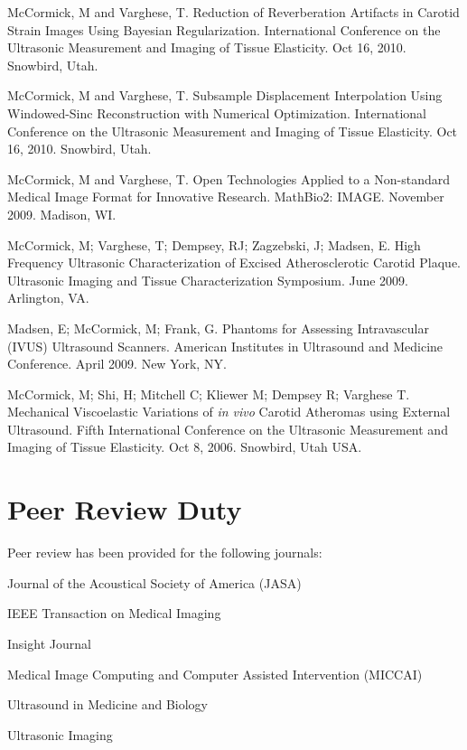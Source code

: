 \documentclass[margin,line]{res}
\newenvironment{list1}{
  \begin{list}{\ding{113}}{%
      \setlength{\itemsep}{0in}
      \setlength{\parsep}{0in} \setlength{\parskip}{0in}
      \setlength{\topsep}{0in} \setlength{\partopsep}{0in} 
      \setlength{\leftmargin}{0.17in}}}{\end{list}}
\begin{document}
\begin{resume}
McCormick, M and Varghese, T.  Reduction of Reverberation Artifacts in Carotid
Strain Images Using Bayesian Regularization.  International Conference on the
Ultrasonic Measurement and Imaging of Tissue Elasticity.  Oct 16, 2010.
Snowbird, Utah.

McCormick, M and Varghese, T.  Subsample Displacement Interpolation Using
Windowed-Sinc Reconstruction with Numerical Optimization.  International
Conference on the Ultrasonic Measurement and Imaging of Tissue Elasticity.  Oct
16, 2010.  Snowbird, Utah.

McCormick, M and Varghese, T.  Open Technologies Applied to a Non-standard Medical
Image Format for Innovative Research.  MathBio2: IMAGE.  November 2009.  Madison, WI.

McCormick, M; Varghese, T; Dempsey, RJ; Zagzebski, J; Madsen, E.  High Frequency Ultrasonic Characterization of Excised Atherosclerotic
Carotid Plaque.  Ultrasonic Imaging and Tissue Characterization
Symposium.  June 2009.  Arlington, VA.

Madsen, E;  McCormick, M;  Frank, G.  Phantoms for Assessing
Intravascular (IVUS) Ultrasound Scanners.  American Institutes in
Ultrasound and Medicine Conference.  April 2009.  New York, NY.

McCormick, M; Shi, H; Mitchell C; Kliewer M; Dempsey R; Varghese T.   Mechanical
Viscoelastic Variations of \textit{in vivo} Carotid Atheromas using External
Ultrasound.  Fifth International Conference on the Ultrasonic Measurement and
Imaging of Tissue Elasticity.  Oct 8, 2006.  Snowbird, Utah USA.


\section{\sc Peer Review Duty}

Peer review has been provided for the following journals:

\begin{list1}
\item[] Journal of the Acoustical Society of America (JASA)
\item[] IEEE Transaction on Medical Imaging
\item[] Insight Journal
\item[] Medical Image Computing and Computer Assisted Intervention (MICCAI)
\item[] Ultrasound in Medicine and Biology
\item[] Ultrasonic Imaging
\end{list1}


\end{resume}
\end{document}
